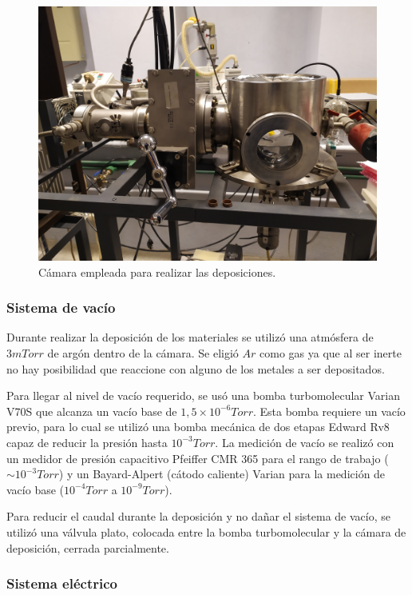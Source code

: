 \documentclass[12pt]{article}
\theoremstyle{definition}
\theoremstyle{remark}
\begin{document}
\begin{figure}[H]
	\centering
	\includegraphics[scale=0.1]{img/camara.jpg}
	\caption{Cámara empleada para realizar las deposiciones.}
	\label{camara}
\end{figure}

\subsubsection{Sistema de vacío}

Durante realizar la deposición de los materiales se utilizó una atmósfera de $3 mTorr$ de argón dentro de la cámara. Se eligió $Ar$ como gas ya que al ser inerte no hay posibilidad que reaccione con alguno de los metales a ser depositados.


Para llegar al nivel de vacío requerido, se usó una bomba turbomolecular Varian V70S que alcanza un vacío base de $1,5 \times 10^{-6}Torr$. Esta bomba requiere un vacío previo, para lo cual se utilizó una bomba mecánica de dos etapas Edward Rv8 capaz de reducir la presión hasta $10^{-3}Torr$. La medición de vacío se realizó con un medidor de presión capacitivo Pfeiffer CMR 365 para el rango de trabajo ($\sim10^{-3}Torr$) y un Bayard-Alpert (cátodo caliente) Varian para la medición de vacío base ($10^{-4}Torr$ a $10^{-9}Torr$).

Para reducir el caudal durante la deposición y no dañar el sistema de vacío, se utilizó una válvula plato, colocada entre la bomba turbomolecular y la cámara de deposición, cerrada parcialmente.


\subsubsection{Sistema eléctrico}
\end{document}
